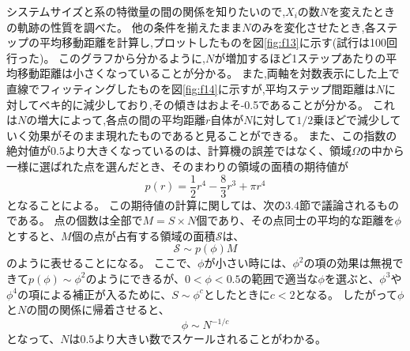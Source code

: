 システムサイズと系の特徴量の間の関係を知りたいので,$X_{i}$の数$N$を変えたときの軌跡の性質を調べた。
他の条件を揃えたまま$N$のみを変化させたとき,各ステップの平均移動距離を計算し,プロットしたものを図\ref{fig:f13}に示す(試行は100回行った)。
このグラフから分かるように,$N$が増加するほど1ステップあたりの平均移動距離は小さくなっていることが分かる。
また,両軸を対数表示にした上で直線でフィッティングしたものを図\ref{fig:f14}に示すが,平均ステップ間距離は$N$に対してベキ的に減少しており,その傾きはおよそ-0.5であることが分かる。
これは$N$の増大によって,各点の間の平均距離$r$自体が$N$に対して$1/2$乗ほどで減少していく効果がそのまま現れたものであると見ることができる。
また、この指数の絶対値が$0.5$より大きくなっているのは、計算機の誤差ではなく、領域$\Omega$の中から一様に選ばれた点を選んだとき、そのまわりの領域の面積の期待値が
\[p(r) = \frac{1}{2}r^{4} - \frac{8}{3}r^{3} + \pi r^{4}\]
となることによる。
この期待値の計算に関しては、次の3.4節で議論されるものである。
点の個数は全部で$M= S \times N$個であり、その点同士の平均的な距離を$\phi$とすると、$M$個の点が占有する領域の面積$\mathcal{S}$は、
\[\mathcal{S} \sim p(\phi)M\]
のように表せることになる。
ここで、$\phi$が小さい時には、$\phi^{2}$の項の効果は無視できて$p(\phi)\sim \phi^{2}$のようにできるが、$0<\phi<0.5$の範囲で適当な$\phi$を選ぶと、$\phi^{3}$や$\phi^{4}$の項による補正が入るために、$S \sim \phi^{c}$としたときに$c<2$となる。
したがって$\phi$と$N$の間の関係に帰着させると、
\[\phi \sim N^{-1/c}\]
となって、$N$は$0.5$より大きい数でスケールされることがわかる。

